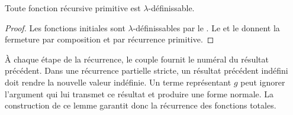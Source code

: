 \documentclass[../../../include/open-logic-section]{subfiles}
\begin{document}
\begin{prop}
Toute fonction récursive primitive
est $\lambda$-définissable.
\end{prop}

\begin{proof}
Les fonctions initiales sont
$\lambda$-définissables par le
. Le
 et le 
donnent la fermeture par composition
et par récurrence primitive.
\end{proof}

À chaque étape de la récurrence, le couple fournit le
numéral du résultat précédent. Dans une récurrence partielle stricte,
un résultat précédent indéfini doit rendre la nouvelle
valeur indéfinie. Un terme représentant $g$ peut ignorer
l'argument qui lui transmet ce résultat et produire une
forme normale. La construction de ce lemme garantit donc
la récurrence des fonctions totales.
\end{document}
